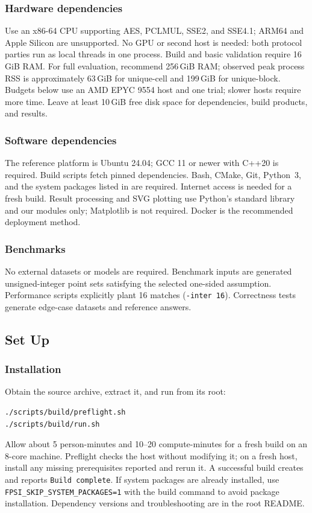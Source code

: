 \subsubsection{Hardware dependencies}
Use an x86-64 CPU supporting AES, PCLMUL, SSE2, and SSE4.1;
ARM64 and Apple Silicon are unsupported. No GPU or second host is needed:
both protocol parties run as local threads in one process. Build and basic
validation require 16\,GiB RAM. For full evaluation, recommend 256\,GiB RAM;
observed peak process RSS is approximately 63\,GiB for unique-cell and
199\,GiB for unique-block. Budgets below use an AMD EPYC 9554 host and
one trial; slower hosts require more time. Leave at least 10\,GiB free disk
space for dependencies, build products, and results.

\subsubsection{Software dependencies}
The reference platform is Ubuntu 24.04; GCC 11 or newer with C++20 is
required. Build scripts fetch pinned dependencies.
Bash, CMake, Git, Python~3, and the system packages listed in
 are required. Internet access is needed for a fresh build. Result processing and
SVG plotting use Python's standard library and our modules only; Matplotlib
is not required. Docker is the recommended deployment method.

\subsubsection{Benchmarks}
No external datasets or models are required. Benchmark inputs are generated
unsigned-integer point sets satisfying the selected one-sided assumption.
Performance scripts explicitly plant 16 matches (\texttt{-inter 16}). Correctness tests generate
edge-case datasets and reference answers.

\subsection{Set Up}
\subsubsection{Installation}
Obtain the source archive, extract it, and run from its root:
\begin{lstlisting}
./scripts/build/preflight.sh
./scripts/build/run.sh
\end{lstlisting}
Allow about 5 person-minutes and 10--20 compute-minutes for a fresh build on
an 8-core machine. Preflight checks the host without modifying it; on a fresh
host, install any missing prerequisites reported and rerun it. A successful
build creates  and reports \texttt{Build complete}.
If system packages are already installed, use
\texttt{FPSI\_SKIP\_SYSTEM\_PACKAGES=1} with the build command to avoid package
installation. Dependency versions and troubleshooting are in the root README.

